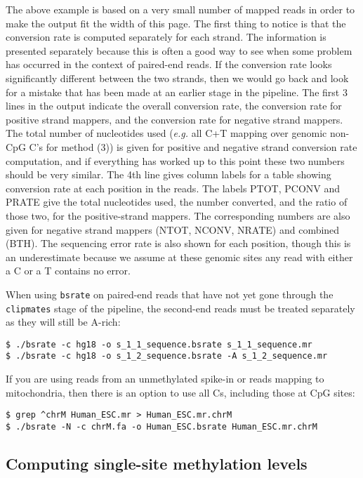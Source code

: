\documentclass[10pt]{article}
\newcommand{\prog}[1]{\texttt{#1}}
\begin{document}
\noindent
The above example is based on a very small number of mapped reads in
order to make the output fit the width of this page.  The first thing
to notice is that the conversion rate is computed separately for each
strand. The information is presented separately because this is often
a good way to see when some problem has occurred in the context of
paired-end reads. If the conversion rate looks significantly different
between the two strands, then we would go back and look for a mistake
that has been made at an earlier stage in the pipeline. The first 3
lines in the output indicate the overall conversion rate, the
conversion rate for positive strand mappers, and the conversion rate
for negative strand mappers. The total number of nucleotides used
({\em e.g.} all C+T mapping over genomic non-CpG C's for method (3)) is
given for positive and negative strand conversion rate computation,
and if everything has worked up to this point these two numbers should
be very similar. The 4th line gives column labels for a table showing
conversion rate at each position in the reads.  The labels PTOT, PCONV
and PRATE give the total nucleotides used, the number converted, and
the ratio of those two, for the positive-strand mappers. The
corresponding numbers are also given for negative strand mappers
(NTOT, NCONV, NRATE) and combined (BTH). The sequencing error rate is
also shown for each position, though this is an underestimate because
we assume at these genomic sites any read with either a C or a T
contains no error.

When using \prog{bsrate} on paired-end reads that have not yet gone
through the \prog{clipmates} stage of the pipeline, the second-end
reads must be treated separately as they will still be A-rich:
\begin{verbatim}
$ ./bsrate -c hg18 -o s_1_1_sequence.bsrate s_1_1_sequence.mr
$ ./bsrate -c hg18 -o s_1_2_sequence.bsrate -A s_1_2_sequence.mr
\end{verbatim}
If you are using reads from an unmethylated spike-in or reads mapping
to mitochondria, then there is an option to use all Cs, including those
at CpG sites:
\begin{verbatim}
$ grep ^chrM Human_ESC.mr > Human_ESC.mr.chrM
$ ./bsrate -N -c chrM.fa -o Human_ESC.bsrate Human_ESC.mr.chrM
\end{verbatim}

\subsection{Computing single-site methylation levels}
\label{sec:estim-methyl-freq}
\end{document}
